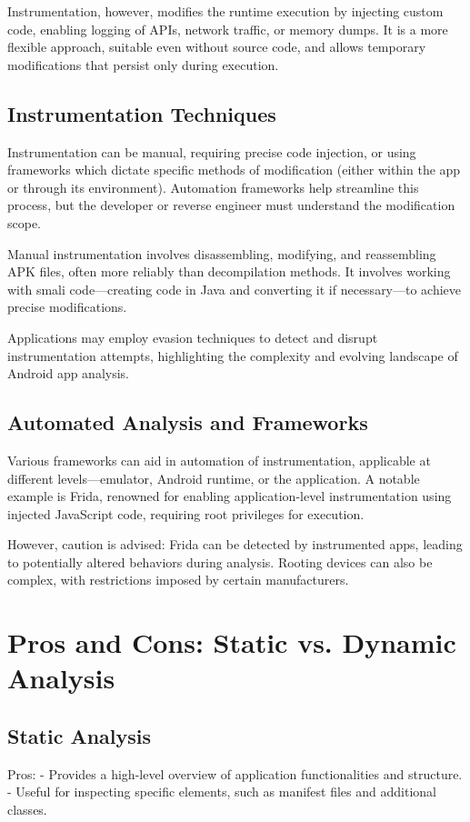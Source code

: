\documentclass{article}
\begin{document}
Instrumentation, however, modifies the runtime execution by injecting custom code, enabling logging of APIs, network traffic, or memory dumps. It is a more flexible approach, suitable even without source code, and allows temporary modifications that persist only during execution.

\subsection*{Instrumentation Techniques}
Instrumentation can be manual, requiring precise code injection, or using frameworks which dictate specific methods of modification (either within the app or through its environment). Automation frameworks help streamline this process, but the developer or reverse engineer must understand the modification scope.

Manual instrumentation involves disassembling, modifying, and reassembling APK files, often more reliably than decompilation methods. It involves working with smali code—creating code in Java and converting it if necessary—to achieve precise modifications.

Applications may employ evasion techniques to detect and disrupt instrumentation attempts, highlighting the complexity and evolving landscape of Android app analysis. 

\subsection*{Automated Analysis and Frameworks}
Various frameworks can aid in automation of instrumentation, applicable at different levels—emulator, Android runtime, or the application. A notable example is Frida, renowned for enabling application-level instrumentation using injected JavaScript code, requiring root privileges for execution.

However, caution is advised: Frida can be detected by instrumented apps, leading to potentially altered behaviors during analysis. Rooting devices can also be complex, with restrictions imposed by certain manufacturers.

\section*{Pros and Cons: Static vs. Dynamic Analysis}
\subsection*{Static Analysis}
Pros:
- Provides a high-level overview of application functionalities and structure.
- Useful for inspecting specific elements, such as manifest files and additional classes.
\end{document}
